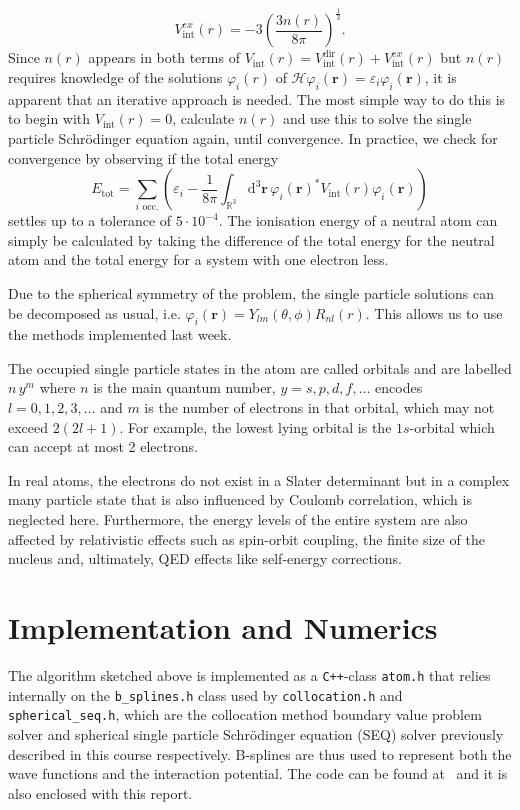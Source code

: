 \documentclass[a4paper,DIV=12,english]{scrartcl}
\begin{document}
\begin{equation}
    V_\text{int}^{ex}({r}) = -3\left( \frac{3n({r})}{8\pi} \right)^{\frac{1}{3}}.
\end{equation}
Since $n(r)$ appears in both terms of $V_\text{int}(r) = V_\text{int}^{\text{dir}}({r}) + V_\text{int}^{ex}({r})$ but $n(r)$ requires knowledge of the solutions $\varphi_i(r)$ of $\mathcal{H}\varphi_i(\textbf{r}) = \varepsilon_i\varphi_i(\textbf{r})$, it is apparent that an iterative approach is needed. The most simple way to do this is to begin with $V_\text{int}(r) = 0$, calculate $n(r)$ and use this to solve the single particle Schrödinger equation again, until convergence. In practice, we check for convergence by observing if the total energy
\begin{equation}
        E_\text{tot} = \sum_{i\text{ occ.}} \left(\varepsilon_i - \frac{1}{8\pi}\int_{\mathbb{R}^3} \text{d}^3\textbf{r}\,\varphi_i(\textbf{r})^* V_\text{int}(r) \varphi_i(\textbf{r}) \right)
\end{equation}
settles up to a tolerance of $5\cdot 10^{-4}$. The ionisation energy of a neutral atom can simply be calculated by taking the difference of the total energy for the neutral atom and the total energy for a system with one electron less.

Due to the spherical symmetry of the problem, the single particle solutions can be decomposed as usual, i.e. $\varphi_i(\textbf{r}) = Y_{lm}(\theta, \phi)R_{nl}(r)$. This allows us to use the methods implemented last week.

The occupied single particle states in the atom are called orbitals and are labelled $n\,y^m$ where $n$ is the main quantum number, $y=s,p,d,f,\dots$ encodes $l=0,1,2,3,\dots$ and $m$ is the number of electrons in that orbital, which may not exceed $2(2l+1)$. For example, the lowest lying orbital is the $1s$-orbital which can accept at most 2 electrons.

In real atoms, the electrons do not exist in a Slater determinant but in a complex many particle state that is also influenced by Coulomb correlation, which is neglected here. Furthermore, the energy levels of the entire system are also affected by relativistic effects such as spin-orbit coupling, the finite size of the nucleus and, ultimately, QED effects like self-energy corrections.

\FloatBarrier
\section{Implementation and Numerics}
The algorithm sketched above is implemented as a \texttt{C++}-class \texttt{atom.h} that relies internally on the \texttt{b\_splines.h} class used by \texttt{collocation.h} and \texttt{spherical\_seq.h}, which are the collocation method boundary value problem solver and spherical single particle Schrödinger equation (SEQ) solver previously described in this course respectively. B-splines are thus used to represent both the wave functions and the interaction potential. The code can be found at~\cite{github} and it is also enclosed with this report.
\end{document}
